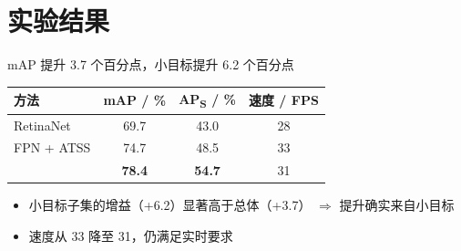 \section{实验结果}

\begin{frame}{mAP 提升 3.7 个百分点，小目标提升 6.2 个百分点}
  \begin{table}
    \centering
    \begin{tabular}{l S[table-format=2.1] S[table-format=2.1] S[table-format=2.0]}
      \toprule
      {方法} & {mAP / \%} & {AP\textsubscript{S} / \%} & {速度 / FPS} \\
      \midrule
      RetinaNet    & 69.7 & 43.0 & 28 \\
      FPN + ATSS   & 74.7 & 48.5 & 33 \\
      \midrule
      \textbf{\ourmethod{}} & \bfseries 78.4 & \bfseries 54.7 & 31 \\
      \bottomrule
    \end{tabular}
  \end{table}

  \vspace{0.8em}
  \begin{itemize}
    \setlength{\itemsep}{0.5em}
    \item 小目标子集的增益（\alert{+6.2}）显著高于总体（+3.7）
          \;$\Rightarrow$\; 提升确实来自小目标
    \item 速度从 \qty{33}{\fps} 降至 \qty{31}{\fps}，仍满足实时要求
  \end{itemize}

\end{frame}

